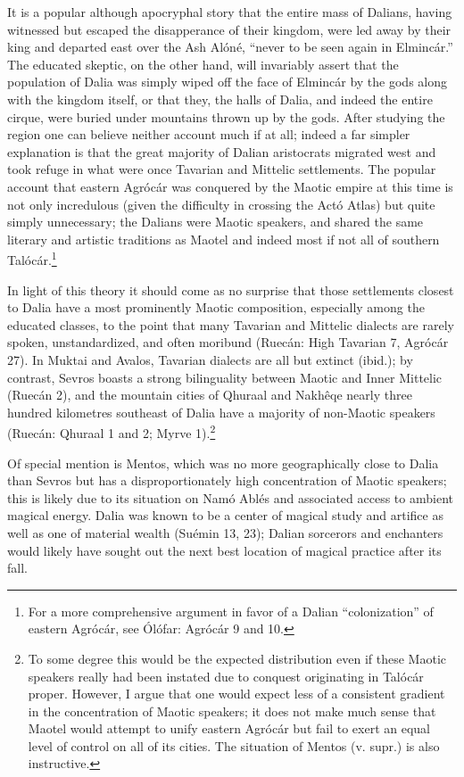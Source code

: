 \documentclass{article}
\begin{document}
{It is a popular although apocryphal story that the entire mass of Dalians, having witnessed but escaped the disapperance of their kingdom, were led away by their king and departed east over the Ash Alóné, ``never to be seen again in Elmincár.'' The educated skeptic, on the other hand, will invariably assert that the population of Dalia was simply wiped off the face of Elmincár by the gods along with the kingdom itself, or that they, the halls of Dalia, and indeed the entire cirque, were buried under mountains thrown up by the gods. After studying the region one can believe neither account much if at all; indeed a far simpler explanation is that the great majority of Dalian aristocrats migrated west and took refuge in what were once Tavarian and Mittelic settlements. The popular account that eastern Agrócár was conquered by the Maotic empire at this time is not only incredulous (given the difficulty in crossing the Actó Atlas) but quite simply unnecessary; the Dalians were Maotic speakers, and shared the same literary and artistic traditions as Maotel and indeed most if not all of southern Talócár.\footnote{For a more comprehensive argument in favor of a Dalian ``colonization'' of eastern Agrócár, see Ólófar: Agrócár 9 and 10.}

In light of this theory it should come as no surprise that those settlements closest to Dalia have a most prominently Maotic composition, especially among the educated classes, to the point that many Tavarian and Mittelic dialects are rarely spoken, unstandardized, and often moribund (Ruecán: High Tavarian 7, Agrócár 27). In Muktai and Avalos, Tavarian dialects are all but extinct (ibid.); by contrast, Sevros boasts a strong bilinguality between Maotic and Inner Mittelic (Ruecán 2), and the mountain cities of Qhuraal and Nakhêqe nearly three hundred kilometres southeast of Dalia have a majority of non-Maotic speakers (Ruecán: Qhuraal 1 and 2; Myrve 1).\footnote{To some degree this would be the expected distribution even if these Maotic speakers really had been instated due to conquest originating in Talócár proper. However, I argue that one would expect less of a consistent gradient in the concentration of Maotic speakers; it does not make much sense that Maotel would attempt to unify eastern Agrócár but fail to exert an equal level of control on all of its cities. The situation of Mentos (v. supr.) is also instructive.}

Of special mention is Mentos, which was no more geographically close to Dalia than Sevros but has a disproportionately high concentration of Maotic speakers; this is likely due to its situation on Namó Ablés and associated access to ambient magical energy. Dalia was known to be a center of magical study and artifice as well as one of material wealth (Suémin 13, 23); Dalian sorcerors and enchanters would likely have sought out the next best location of magical practice after its fall.


}
\end{document}
